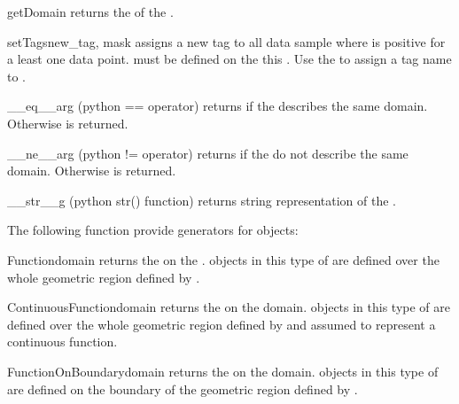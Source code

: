 \begin{methoddesc}[FunctionSpace]{getDomain}{}
returns the \Domain of the \FunctionSpace.
\end{methoddesc}

\begin{methoddesc}[FunctionSpace]{setTags}{new_tag, mask}
assigns a new tag  to all data sample 
where  is positive for a least one data point. 
 must be defined on the this \FunctionSpace.
Use the  to assign a tag name to .
\end{methoddesc}

\begin{methoddesc}[FunctionSpace]{__eq__}{arg}
(python == operator) returns \True if the \Domain {} describes the same domain. Otherwise
\False is returned.
\end{methoddesc}

\begin{methoddesc}[FunctionSpace]{__ne__}{arg}
(python != operator) returns \True if the \Domain {} do not describe the same domain. 
Otherwise \False is returned.
\end{methoddesc}

\begin{methoddesc}[Domain]{__str__}{g}
(python str() function) returns string representation of the \Domain.
\end{methoddesc}

The following function provide generators for \FunctionSpace objects:
\begin{funcdesc}{Function}{domain}
returns the \Function on the \Domain {}. \Data objects in this type of \Function
are defined over the whole geometric region defined by . 
\end{funcdesc}

\begin{funcdesc}{ContinuousFunction}{domain}
returns the \ContinuousFunction on the \Domain domain. \Data objects in this type of \Function
are defined over the whole geometric region defined by  and assumed to represent
a continuous function.
\end{funcdesc}

\begin{funcdesc}{FunctionOnBoundary}{domain}
returns the \ContinuousFunction on the \Domain domain. \Data objects in this type of \Function
are defined on the boundary of the geometric region defined by . 
\end{funcdesc}

